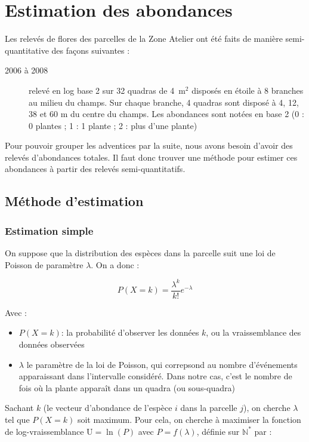 \documentclass[a4paper, 12pt]{article}
\begin{document}
\section{Estimation des abondances}

Les relevés de flores des parcelles de la Zone Atelier ont été faits de manière
semi-quantitative des façons suivantes :

\begin{description}
  \item[2006 à 2008] relevé en log base 2 sur 32 quadras de 4~m$^2$ disposés en
    étoile à 8 branches au milieu du champs. Sur chaque branche, 4 quadras sont
    disposé à 4, 12, 38 et 60 m du centre du champs. Les abondances sont notées
    en base 2 (0 : 0 plantes ; 1 : 1 plante ; 2 : plus d'une plante)
\end{description}

Pour pouvoir grouper les adventices par la suite, nous avons besoin d'avoir des
relevés d'abondances totales.
Il faut donc trouver une méthode pour estimer ces abondances à partir des
relevés semi-quantitatifs.


\subsection{Méthode d'estimation}

\subsubsection{Estimation simple}

On suppose que la distribution des espèces dans la parcelle suit une loi de
Poisson de paramètre $\lambda$.
On a donc :

\[
  P(X = k) = \frac{\lambda^k}{k!} e^{-\lambda}
\]

Avec :
\begin{itemize}
  \item $P(X = k)$: la probabilité d'observer les données $k$, ou la
    vraissemblance des données observées
  \item $\lambda$ le paramètre de la loi de Poisson, qui correpsond au nombre
    d'événements apparaissant dans l'intervalle considéré. Dans notre cas, c'est
    le nombre de fois où la plante apparaît dans un quadra (ou sous-quadra)
\end{itemize}

Sachant $k$ (le vecteur d'abondance de l'espèce $i$ dans la parcelle $j$), on
cherche $\lambda$ tel que $P(X=k)$ soit maximum.
Pour cela, on cherche à maximiser la fonction de log-vraissemblance $\mathrm{U}
= \ln(P)$ avec $ P = f(\lambda)$, définie sur $\mathbb{N}^*$ par :
\end{document}
